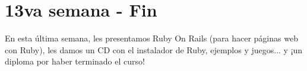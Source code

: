 \chapter{13va semana - Fin}
En esta última semana, les presentamos Ruby On Rails (para hacer páginas web con Ruby), les damos un CD con el instalador de Ruby, ejemplos y juegos... y ¡un diploma por haber terminado el curso!